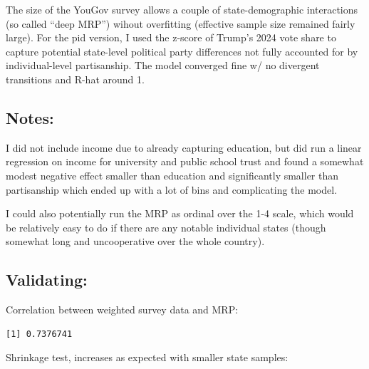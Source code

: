 \documentclass[
  letterpaper,
  DIV=11,
  numbers=noendperiod]{scrartcl}
\newenvironment{Shaded}{\begin{snugshade}}{\end{snugshade}}
\newcommand{\AttributeTok}[1]{\textcolor[rgb]{0.40,0.45,0.13}{#1}}
\newcommand{\FunctionTok}[1]{\textcolor[rgb]{0.28,0.35,0.67}{#1}}
\newcommand{\NormalTok}[1]{\textcolor[rgb]{0.00,0.23,0.31}{#1}}
\newcommand{\OtherTok}[1]{\textcolor[rgb]{0.00,0.23,0.31}{#1}}
\newcommand{\SpecialCharTok}[1]{\textcolor[rgb]{0.37,0.37,0.37}{#1}}
\begin{document}
The size of the YouGov survey allows a couple of state-demographic
interactions (so called ``deep MRP'') wihout overfitting (effective
sample size remained fairly large). For the pid version, I used the
z-score of Trump's 2024 vote share to capture potential state-level
political party differences not fully accounted for by individual-level
partisanship. The model converged fine w/ no divergent transitions and
R-hat around 1.

\subsection{Notes:}\label{notes}

I did not include income due to already capturing education, but did run
a linear regression on income for university and public school trust and
found a somewhat modest negative effect smaller than education and
significantly smaller than partisanship which ended up with a lot of
bins and complicating the model.

I could also potentially run the MRP as ordinal over the 1-4 scale,
which would be relatively easy to do if there are any notable individual
states (though somewhat long and uncooperative over the whole country).

\subsection{Validating:}\label{validating}

Correlation between weighted survey data and MRP:

\begin{Shaded}
\end{Shaded}

\begin{verbatim}
[1] 0.7376741
\end{verbatim}

Shrinkage test, increases as expected with smaller state samples:

\begin{Shaded}
\end{Shaded}
\end{document}
